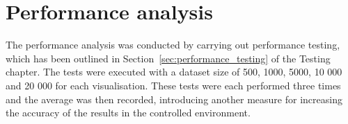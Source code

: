 \section{Performance analysis} {
\label{sec:performance_analysis}


	The performance analysis was conducted by carrying out performance testing, which has been outlined in Section~\ref{sec:performance_testing} of the Testing chapter. The tests were executed with a dataset size of 500, 1000, 5000, 10 000 and 20 000 for each visualisation. These tests were each performed three times and the average was then recorded, introducing another measure for increasing the accuracy of the results in the controlled environment.

}

